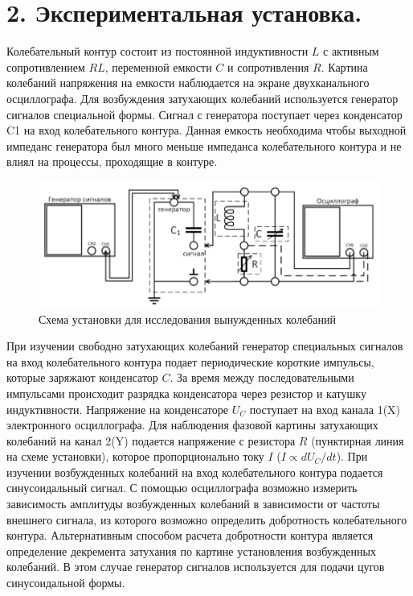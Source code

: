 \documentclass[a4paper,12pt]{article}
\begin{document}
\newpage

\section*{2. Экспериментальная установка.}

Колебательный контур состоит из постоянной индуктивности $L$ с активным сопротивлением $RL$, переменной емкости $C$ и сопротивления $R$. 
Картина колебаний напряжения на емкости наблюдается на экране двухканального осциллографа. Для возбуждения затухающих колебаний используется генератор сигналов специальной формы.
Сигнал с генератора поступает через конденсатор C1 на вход колебательного контура. Данная емкость необходима чтобы выходной импеданс генератора был много меньше импеданса колебательного контура и не влиял на процессы, проходящие в контуре. 

\begin{figure}[h]
    \includegraphics[scale=0.5]{ustanovka.png}
    \centering
    \caption{ Схема установки для исследования вынужденных колебаний}
\end{figure}

При изучении свободно затухающих колебаний генератор специальных сигналов на вход колебательного контура подает периодические короткие импульсы, которые заряжают конденсатор $C$. За время между
последовательными импульсами происходит разрядка конденсатора через резистор и катушку индуктивности. Напряжение на конденсаторе $U_C$ поступает на вход канала 1(X) электронного осциллографа. Для наблюдения фазовой картины затухающих колебаний на канал 2(Y) подается напряжение с резистора $R$ (пунктирная линия на
схеме установки), которое пропорционально току $I$ ($I\propto dU_C/dt$).
При изучении возбужденных колебаний на вход колебательного контура подается
синусоидальный сигнал. С помощью осциллографа возможно измерить зависимость
амплитуды возбужденных колебаний в зависимости от частоты внешнего сигнала,
из которого возможно определить добротность колебательного контура. Альтернативным способом расчета добротности контура является определение декремента
затухания по картине установления возбужденных колебаний. В этом случае генератор сигналов используется для подачи цугов синусоидальной формы.
\end{document}
